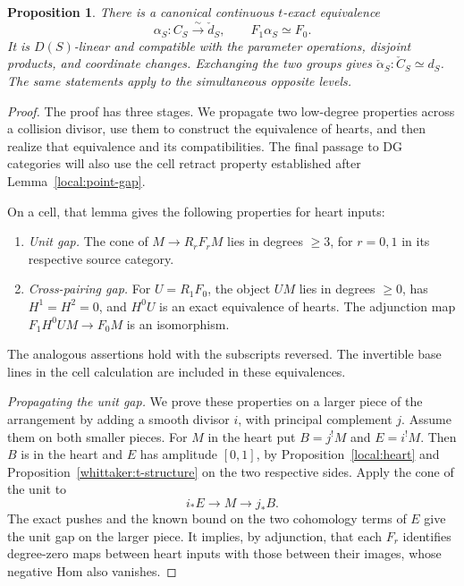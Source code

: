 \documentclass[11pt]{article}
\numberwithin{equation}{section}
\newtheorem{proposition}[theorem]{Proposition}
\theoremstyle{definition}
\theoremstyle{remark}
\begin{document}
\begin{proposition}\label{local:one-slot}
There is a canonical continuous $t$-exact equivalence
\begin{equation}\label{eq:L11}
 \alpha_S:C_S\xrightarrow{\ \sim\ }\check d_S,
                 \qquad F_1\alpha_S\simeq F_0.
\end{equation}
It is $D(S)$-linear and compatible with the parameter operations,
disjoint products, and coordinate changes.  Exchanging the two
groups gives $\check\alpha_S:\check C_S\simeq d_S$.
The same statements apply to the simultaneous opposite levels.
\end{proposition}

\begin{proof}
The proof has three stages.  We propagate two low-degree properties
across a collision divisor, use them to construct the equivalence of
hearts, and then realize that equivalence and its compatibilities.
The final passage to DG categories will also use the cell retract
property established after Lemma~\ref{local:point-gap}.

On a cell, that lemma gives the following properties for heart inputs:
\begin{enumerate}
\item \emph{Unit gap.}  The cone of $M\to R_rF_rM$ lies in degrees
      $\ge3$, for $r=0,1$ in its respective source category.
\item \emph{Cross-pairing gap.}  For $U=R_1F_0$, the object $UM$ lies in degrees $\ge0$,
      has $H^1=H^2=0$, and $H^0U$ is an exact equivalence of
      hearts.  The adjunction map
      $F_1H^0UM\to F_0M$ is an isomorphism.
\end{enumerate}
The analogous assertions hold with the subscripts reversed.
The invertible base lines in the cell calculation are included
in these equivalences.

\smallskip
\noindent\emph{Propagating the unit gap.}
We prove these properties on a larger piece of the arrangement by
adding a smooth divisor $i$, with principal complement $j$.
Assume them on both smaller pieces.  For $M$ in the heart put
$B=j^!M$ and $E=i^!M$.  Then $B$ is in the heart and $E$ has
amplitude $[0,1]$, by Proposition~\ref{local:heart} and
Proposition~\ref{whittaker:t-structure} on the two respective sides.
Apply the cone of the unit to
\[
                  i_*E\longrightarrow M\longrightarrow j_*B.
\]
The exact pushes and the known bound on the two cohomology terms
of $E$ give the unit gap on the larger piece.  It implies, by
adjunction, that each $F_r$ identifies degree-zero maps between heart inputs with
those between their images, whose negative Hom also vanishes.


\end{proof}
\end{document}
